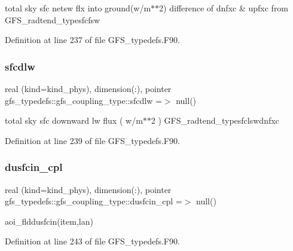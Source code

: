 total sky sfc netsw flx into ground(w/m$\ast$$\ast$2) difference of dnfxc \& upfxc from G\+F\+S\+\_\+radtend\+\_\+typesfcfsw 



Definition at line 237 of file G\+F\+S\+\_\+typedefs.\+F90.

\mbox{\label{structgfs__typedefs_1_1gfs__coupling__type_af93ec4d21e8f743bef69cbd1f1444d7f}} 
\subsubsection{sfcdlw}
{\footnotesize\ttfamily real (kind=kind\+\_\+phys), dimension(\+:), pointer gfs\+\_\+typedefs\+::gfs\+\_\+coupling\+\_\+type\+::sfcdlw =$>$ null()}



total sky sfc downward lw flux ( w/m$\ast$$\ast$2 ) G\+F\+S\+\_\+radtend\+\_\+typesfclswdnfxc 



Definition at line 239 of file G\+F\+S\+\_\+typedefs.\+F90.

\mbox{\label{structgfs__typedefs_1_1gfs__coupling__type_afb4232fdc5ab455e82f290fbd1f93ae3}} 
\subsubsection{dusfcin\+\_\+cpl}
{\footnotesize\ttfamily real (kind=kind\+\_\+phys), dimension(\+:), pointer gfs\+\_\+typedefs\+::gfs\+\_\+coupling\+\_\+type\+::dusfcin\+\_\+cpl =$>$ null()}



aoi\+\_\+flddusfcin(item,lan) 



Definition at line 243 of file G\+F\+S\+\_\+typedefs.\+F90.

\mbox{\label{structgfs__typedefs_1_1gfs__coupling__type_a18bdd27fc57e4a0f234adfe05b8eaee0}} 
